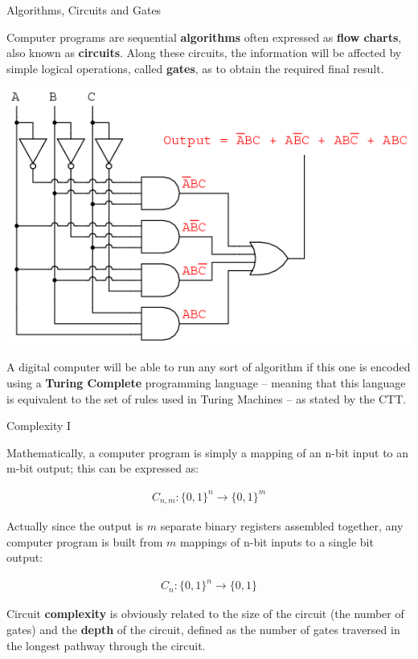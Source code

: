 \documentclass[9pt, handout, aspectratio=169]{beamer}		%
\begin{document}
	\begin{frame}{Algorithms, Circuits and Gates}
		
		Computer programs are sequential \textbf{algorithms} often expressed as \textbf{flow charts}, also known as \textbf{circuits}. Along these circuits, the information will be affected by simple logical operations, called \textbf{gates}, as to obtain the required final result.
		
		\begin{center}
		\includegraphics[width=.34\paperwidth]{Figures/Digital_Gates}
		\end{center}
		
		\pause
		
		\vspace{4pt}
		A digital computer will be able to run any sort of algorithm if this one is encoded using a \textbf{Turing Complete} programming language -- meaning that this language is equivalent to the set of rules used in Turing Machines -- as stated by the CTT.
		
	\end{frame}
	

	\begin{frame}{Complexity I}
	
		Mathematically, a computer program is simply a mapping of an n-bit input to an m-bit output; this can be expressed as:
		
		\begin{align*}
			C_{n,m}:\lbrace 0,1 \rbrace^n \rightarrow \lbrace 0,1 \rbrace^m
		\end{align*}
		
		Actually since the output is $m$ separate binary registers assembled together, any computer program is built from $m$ mappings of n-bit inputs to a single bit output:
		
		\begin{align*}
			C_{n}:\lbrace 0,1 \rbrace^n \rightarrow \lbrace 0,1 \rbrace
		\end{align*}
		
		\pause
		
		Circuit \textbf{complexity} is obviously related to the size of the circuit (the number of gates) and the \textbf{depth} of the circuit, defined as the number of gates traversed in the longest pathway through the circuit.
		
	\end{frame}
	
\end{document}
